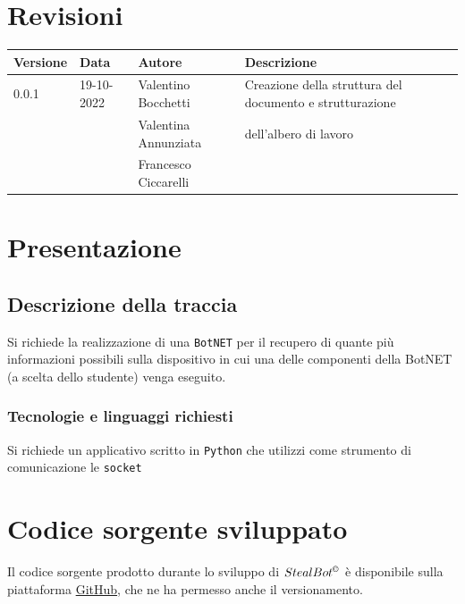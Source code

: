 \documentclass[letterpaper, 11pt]{article}
\begin{document}
\section{Revisioni}
\label{sec:org6c21ea6}
\begin{center}
\begin{tabular}{|p{}|p{}|p{}|p{}|}
\hline
Versione & Data & Autore & Descrizione\\
\hline
0.0.1 & 19-10-2022 & Valentino Bocchetti & Creazione della struttura del documento e strutturazione\\
 &  & Valentina Annunziata & dell'albero di lavoro\\
 &  & Francesco Ciccarelli & \\
\hline
\end{tabular}
\end{center}
\pagebreak
\section{Presentazione}
\label{sec:org88a6f49}
\noindent{}
\subsection{Descrizione della traccia}
\label{sec:org9e10224}
Si richiede la realizzazione di una \texttt{BotNET} \autocite{BOTNET} per il recupero di quante più informazioni possibili sulla dispositivo in cui una delle componenti della BotNET (a scelta dello studente) venga eseguito.
\subsubsection{Tecnologie e linguaggi richiesti}
\label{sec:orgc008be1}
Si richiede un applicativo scritto in \texttt{Python} \autocite{DefinizionePython} che utilizzi come strumento di comunicazione le \texttt{socket} \autocite{DefinizioneSocket}
\section{Codice sorgente sviluppato}
\label{sec:orgcb091bc}
Il codice sorgente prodotto durante lo sviluppo di \(StealBot^{\copyright}\) è disponibile sulla piattaforma \href{https://github.com/}{GitHub}, che ne ha permesso anche il versionamento.
\end{document}

